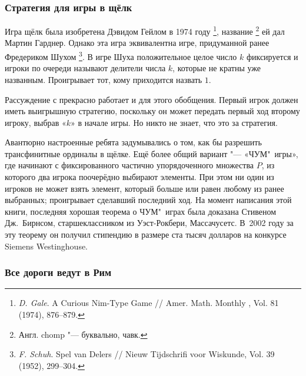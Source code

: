 \documentclass[twoside]{book}
\begin{document}
\subsubsection*{Стратегия для игры в щёлк}

Игра щёлк была изобретена Дэвидом Гейлом в 1974 году%
\footnote{\emph{D. Gale}. A Curious Nim-Type Game /\!/ {Amer. Math. Monthly }, Vol. 81 (1974), 876--879.},
 название%
\footnote{Англ. chomp "--- буквально, чавк.}
 ей дал Мартин Гарднер.
Однако эта игра эквивалентна игре, придуманной ранее Фредериком Шухом%
\footnote{\emph{F. Schuh}. Spel van Delers /\!/ {Nieuw Tijdschrifi voor Wiskunde}, Vol. 39 (1952), 299--304.}.
В игре Шуха положительное целое число $k$ фиксируется и игроки по очереди называют делители числа $k$, которые не кратны уже названным.
Проигрывает тот, кому приходится назвать $1$.


Рассуждение с  прекрасно работает и для этого обобщения.
Первый игрок должен иметь выигрышную стратегию, поскольку он может передать первый ход второму игроку, выбрав «$k$» в начале игры.
Но никто не знает, что это за стратегия.

Авантюрно настроенные ребята задумывались о том, как бы разрешить трансфинитные ординалы в щёлке.
Ещё более общий вариант "--- «ЧУМ"~игры», где начинают с фиксированного частично упорядоченного множества $P$, из которого два игрока поочерёдно выбирают элементы.
При этом ни один из игроков не может взять элемент, который больше или равен любому из ранее выбранных; проигрывает сделавший последний ход.
На момент написания этой книги, последняя хорошая теорема о ЧУМ"~играх была доказана Стивеном Дж.~Бирнсом, старшеклассником из Уэст-Рокбери, Массачусетс.
В~2002 году за эту теорему он получил стипендию в размере ста тысяч долларов на конкурсе Siemens Westinghouse.

\subsubsection*{Все дороги ведут в Рим}
\end{document}
